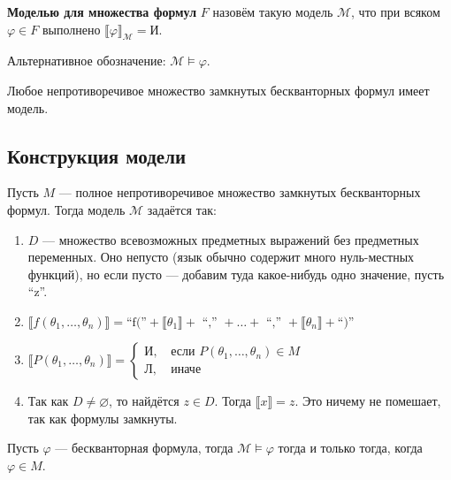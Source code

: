  \textbf{Моделью для множества формул} $F$ назовём такую модель $\mathcal{M}$, что
    при всяком $\varphi \in F$ выполнено $\llbracket\varphi\rrbracket_\mathcal{M} = \text{И}$.

Альтернативное обозначение: $\mathcal{M}\models\varphi$.


Любое непротиворечивое множество замкнутых бескванторных формул имеет модель.

\subsection{Конструкция модели}

Пусть $M$ --- полное непротиворечивое множество замкнутых бескванторных формул. Тогда
модель $\mathcal{M}$ задаётся так:
\begin{enumerate}
\item $D$ --- множество всевозможных предметных выражений без предметных переменных. Оно непусто (язык обычно содержит много нуль-местных функций), 
но если пусто --- добавим туда какое-нибудь одно значение, пусть ``z''.
\item $\llbracket f(\theta_1,\dots,\theta_n) \rrbracket = \mbox{``f(''} + \llbracket\theta_1\rrbracket + \mbox{ ``,'' }
    + \dots + \mbox{ ``,'' } + \llbracket\theta_n\rrbracket + \mbox {``)'' } $
\item $\llbracket P(\theta_1,\dots,\theta_n)\rrbracket = \left\{
  \begin{array}{ll} \mbox{И}, &\mbox{ если } P(\theta_1,\dots,\theta_n) \in M\\
                   \mbox{Л}, &\mbox{ иначе}\end{array}\right.$
\item Так как $D \ne \varnothing$, то найдётся $z \in D$. Тогда $\llbracket x \rrbracket = z$. Это ничему не помешает, так как формулы замкнуты.
\end{enumerate}



Пусть $\varphi$ --- бескванторная формула, тогда $\mathcal{M}\models\varphi$ тогда и только тогда, когда $\varphi\in M$.

